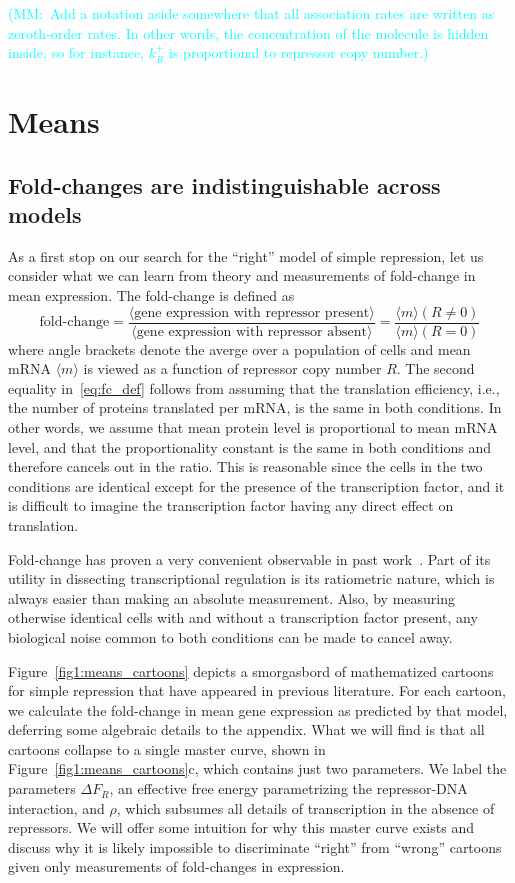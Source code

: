 \documentclass[12pt]{article}%
\newcommand{\mmnote}[1]{\textcolor{cyan}{(MM:~#1)}}
\newcommand{\fig}[1]{Figure~\ref{#1}}
\begin{document}
\mmnote{Add a notation aside somewhere that all association rates are written as zeroth-order rates. In other words, the concentration of the molecule is hidden inside, so for instance, $k_R^+$ is proportional to repressor copy number.}

\section{Means}
\subsection{Fold-changes are indistinguishable across models}
As a first stop on our search for the ``right'' model of simple
repression, let us consider what we can learn from theory and
measurements of fold-change in mean expression. The fold-change is defined as
\begin{equation}
\text{fold-change}
= \frac{\langle \text{gene expression with repressor present} \rangle}
        {\langle \text{gene expression with repressor absent} \rangle}
= \frac{\langle m\rangle(R\ne 0)}{\langle m\rangle(R = 0)}
\label{eq:fc_def}
\end{equation}
where angle brackets denote the averge over a population of cells
and mean mRNA $\langle m\rangle$ is viewed as a function of
repressor copy number $R$.
The second
equality in~\ref{eq:fc_def} follows from assuming that the
translation efficiency, i.e., the number of proteins translated
per mRNA, is the same in both conditions.
In other words, we assume that mean protein level is proportional
to mean mRNA level, and that the proportionality constant is the
same in both conditions and therefore cancels out in the ratio.
This is reasonable since the cells in the two conditions are
identical except for the presence of the transcription factor,
and it is difficult to imagine the transcription factor having
any direct effect on translation.

Fold-change has proven a very convenient observable in past
work~\cite{Garcia2011a, Razo-Mejia2018, Chure2019}.
Part of its utility in dissecting transcriptional regulation is
its ratiometric nature, which is always easier than making an
absolute measurement. Also, by measuring otherwise identical cells
with and without a transcription factor present, any biological
noise common to both conditions can be made to cancel away.

\fig{fig1:means_cartoons} depicts a smorgasbord
of mathematized cartoons for simple repression that have appeared
in previous literature. For each cartoon, we calculate the
fold-change in mean gene expression as predicted by that model,
deferring some algebraic details to the appendix.
What we will find is that all cartoons collapse to a single
master curve, shown in \fig{fig1:means_cartoons}c, which contains
just two parameters. We label the parameters $\Delta F_R$, an
effective free energy parametrizing the repressor-DNA
interaction, and $\rho$, which subsumes all details of
transcription in the absence of repressors.
We will offer some intuition for why this master curve exists and discuss
why it is likely impossible to discriminate ``right'' from ``wrong''
cartoons given only measurements of fold-changes in expression.
\end{document}
